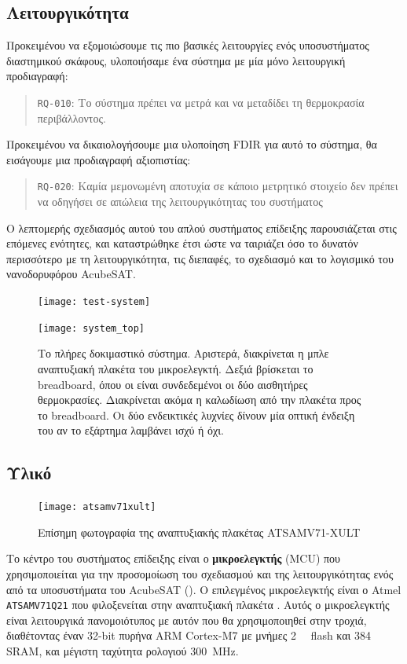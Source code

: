 \documentclass[a4paper,nobib]{tufte-book}
\begin{document}
\subsection{Λειτουργικότητα}
\label{sec:tsvcd}

Προκειμένου να εξομοιώσουμε τις πιο βασικές λειτουργίες ενός υποσυστήματος διαστημικού σκάφους, υλοποιήσαμε ένα σύστημα με μία μόνο λειτουργική προδιαγραφή:
\begin{quote}
	\texttt{RQ-010}: Το σύστημα πρέπει να μετρά και να μεταδίδει τη θερμοκρασία περιβάλλοντος.
\end{quote}

Προκειμένου να δικαιολογήσουμε μια υλοποίηση \ac{FDIR} για αυτό το σύστημα, θα εισάγουμε μια προδιαγραφή αξιοπιστίας:
\begin{quote}
	\texttt{RQ-020}: Καμία μεμονωμένη αποτυχία σε κάποιο μετρητικό στοιχείο δεν πρέπει να οδηγήσει σε απώλεια της λειτουργικότητας του συστήματος
\end{quote}

Ο λεπτομερής σχεδιασμός αυτού του απλού συστήματος επίδειξης παρουσιάζεται στις επόμενες ενότητες, και καταστρώθηκε έτσι ώστε να ταιριάζει όσο το δυνατόν περισσότερο με τη λειτουργικότητα, τις διεπαφές, το σχεδιασμό και το λογισμικό του νανοδορυφόρου AcubeSAT.

\begin{figure}
	\texttt{[image: test-system]}\par
	\vspace*{3ex}
	\texttt{[image: system\_top]}
	\caption[Το πλήρες αναπτυξιακό σύστημα]{Το πλήρες δοκιμαστικό σύστημα. Αριστερά, διακρίνεται η μπλε αναπτυξιακή πλακέτα του μικροελεγκτή. Δεξιά βρίσκεται το breadboard, όπου οι είναι συνδεδεμένοι οι δύο αισθητήρες θερμοκρασίες. Διακρίνεται ακόμα η καλωδίωση από την πλακέτα προς το breadboard. Οι δύο ενδεικτικές λυχνίες δίνουν μία οπτική ένδειξη του αν το εξάρτημα λαμβάνει ισχύ ή όχι.}
\end{figure}

\subsection{Υλικό}

\begin{figure}
	\centering
	\texttt{[image: atsamv71xult]}
	\caption{Επίσημη φωτογραφία της αναπτυξιακής πλακέτας ATSAMV71-XULT}
\end{figure}

Το κέντρο του συστήματος επίδειξης είναι ο \textbf{μικροελεγκτής} (\ac{MCU}) που χρησιμοποιείται για την προσομοίωση του σχεδιασμού και της λειτουργικότητας ενός από τα υποσυστήματα του AcubeSAT (). Ο επιλεγμένος μικροελεγκτής είναι ο Atmel \texttt{ATSAMV71Q21} που φιλοξενείται στην αναπτυξιακή πλακέτα . Αυτός ο μικροελεγκτής είναι λειτουργικά πανομοιότυπος με αυτόν που θα χρησιμοποιηθεί στην τροχιά, διαθέτοντας έναν 32-bit πυρήνα ARM Cortex-M7 με μνήμες \SI{2}{\mebi\byte} flash και \SI{384}{\kibi\byte} \acs{SRAM}, και μέγιστη ταχύτητα ρολογιού \SI{300}{\mega\hertz}.
\end{document}
